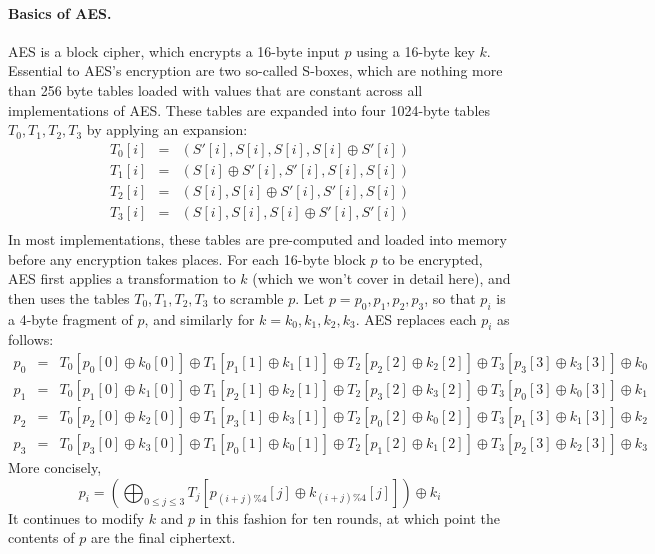 \documentclass[11pt,twoside]{scrartcl}
\begin{document}
\paragraph{Basics of AES.} AES is a block cipher, which encrypts a 16-byte input $p$ using a 16-byte key $k$. Essential to AES's encryption are two so-called S-boxes, which are nothing more than 256 byte tables loaded with values that are constant across all implementations of AES. These tables are expanded into four 1024-byte tables $T_0, T_1, T_2, T_3$ by applying an expansion:
\[
\begin{array}{lcl}
%
T_0[i] & = & (S'[i], S[i], S[i], S[i] \oplus S'[i]) \\
T_1[i] & = & (S[i] \oplus S'[i], S'[i], S[i], S[i]) \\
T_2[i] & = & (S[i], S[i] \oplus S'[i], S'[i], S[i]) \\
T_3[i] & = & (S[i], S[i], S[i] \oplus S'[i], S'[i]) \\
\end{array}
\]
In most implementations, these tables are pre-computed and loaded into memory before any encryption takes places. For each 16-byte block $p$ to be encrypted, AES first applies a transformation to $k$ (which we won't cover in detail here), and then uses the tables $T_0, T_1, T_2, T_3$ to scramble $p$. Let $p = p_0, p_1, p_2, p_3$, so that $p_i$ is a 4-byte fragment of $p$, and similarly for $k = k_0, k_1, k_2, k_3$. AES replaces each $p_i$ as follows:
\[
\begin{array}{lcl}
%
p_0 & = & T_0[p_0[0] \oplus k_0[0]] \oplus T_1[p_1[1] \oplus k_1[1]] \oplus T_2[p_2[2] \oplus k_2[2]] \oplus T_3[p_3[3] \oplus k_3[3]] \oplus k_0 \\
p_1 & = & T_0[p_1[0] \oplus k_1[0]] \oplus T_1[p_2[1] \oplus k_2[1]] \oplus T_2[p_3[2] \oplus k_3[2]] \oplus T_3[p_0[3] \oplus k_0[3]] \oplus k_1 \\
p_2 & = & T_0[p_2[0] \oplus k_2[0]] \oplus T_1[p_3[1] \oplus k_3[1]] \oplus T_2[p_0[2] \oplus k_0[2]] \oplus T_3[p_1[3] \oplus k_1[3]] \oplus k_2 \\
p_3 & = & T_0[p_3[0] \oplus k_3[0]] \oplus T_1[p_0[1] \oplus k_0[1]] \oplus T_2[p_1[2] \oplus k_1[2]] \oplus T_3[p_2[3] \oplus k_2[3]] \oplus k_3
\end{array}
\]
More concisely,
\[
\textstyle
p_i = \left(\bigoplus_{0 \le j \le 3} T_j[p_{(i+j)\%4}[j] \oplus k_{(i+j)\%4}[j]]\right) \oplus k_i
\]
It continues to modify $k$ and $p$ in this fashion for ten rounds, at which point the contents of $p$ are the final ciphertext.
\end{document}
